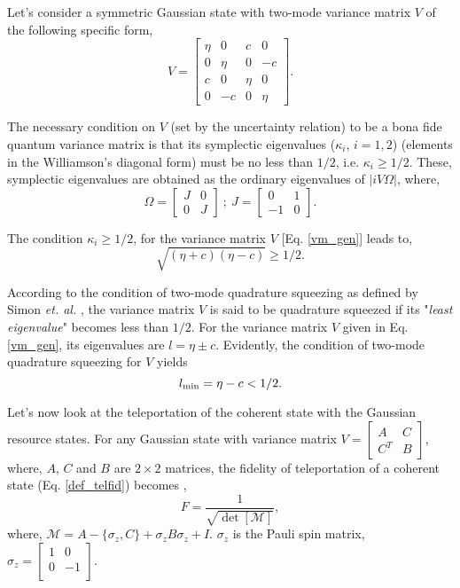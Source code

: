 \documentclass[letter,scriptaddress,twocolumn, prl,showkeys]{revtex4}
\begin{document}
Let's consider a symmetric Gaussian state with two-mode variance matrix $V$ of the following specific form, 
\begin{equation}
V=\begin{bmatrix}
\eta& 0& c& 0\\
0& \eta& 0& -c\\
c& 0& \eta& 0\\
0& -c& 0& \eta
\end{bmatrix} .
\label{vm_gen}
\end{equation} 

The necessary condition on $V$ (set by the uncertainty relation) to be a bona fide quantum variance matrix is that its symplectic eigenvalues ($\kappa_{i}$, $i=1,2$) (elements in the Williamson's diagonal form) must be no less than $1/2$, i.e. $\kappa_{i}\geq 1/2$. 
These, symplectic eigenvalues are obtained as the ordinary eigenvalues of $|iV\Omega|$, where,
\begin{equation}
\Omega=\begin{bmatrix}
J& 0\\
0& J
\end{bmatrix}~;~J=\begin{bmatrix}
0& 1\\
-1& 0
\end{bmatrix} .
\label{def_symplectic_metric}
\end{equation}

The condition $\kappa_{i}\geq 1/2$, for the variance matrix $V$ [Eq. \ref{vm_gen}] leads to,
\begin{equation}
\sqrt{(\eta+c)(\eta-c)}\geq 1/2
\label{cond_vm_bf} .
\end{equation}

According to the condition of two-mode quadrature squeezing as defined by Simon {\it et. al.} \cite{qs_simon}, the variance matrix $V$ is said to be quadrature squeezed if its "{\it least eigenvalue}" becomes less than $1/2$. For the variance matrix $V$ given in Eq. \ref{vm_gen}, its eigenvalues are $l=\eta\pm c$. Evidently, the condition of two-mode quadrature squeezing for $V$ yields
\begin{equation}
l_{\rm{min}}=\eta-c<1/2 .
\label{cond_vm_qs}
\end{equation}

Let's now look at the teleportation of the coherent state with the Gaussian resource states. For any Gaussian state with variance matrix $V=\begin{bmatrix}
A& C\\
C^{T}& B
\end{bmatrix}$, where, $A$, $C$ and $B$ are $2\times 2$ matrices, the fidelity of teleportation of a coherent state (Eq. \ref{def_telfid}) becomes \cite{Pirandola_LasPhys},
\begin{equation}
F=\frac{1}{\sqrt{\det[\mathscr{M}]}},
\label{def_tf_vm}
\end{equation}
where, $\mathscr{M}=A-\lbrace \sigma_{z},C\rbrace+\sigma_{z}B\sigma_{z}+I$. $\sigma_{z}$ is the Pauli spin matrix, $\sigma_{z}=\begin{bmatrix}
1& 0\\
0& -1\\
\end{bmatrix}$.
\end{document}

